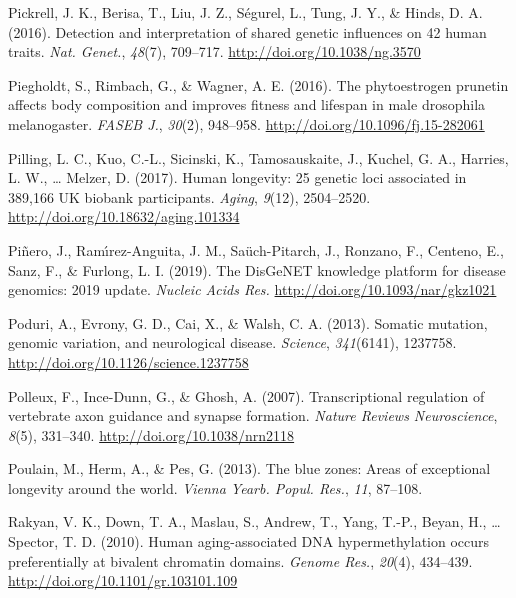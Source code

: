 \documentclass[12pt,twoside]{unicam}
\begin{document}
\begin{cslreferences}
\leavevmode\hypertarget{ref-Pickrell2016}{}%
Pickrell, J. K., Berisa, T., Liu, J. Z., Ségurel, L., Tung, J. Y., \& Hinds, D. A. (2016). Detection and interpretation of shared genetic influences on 42 human traits. \emph{Nat. Genet.}, \emph{48}(7), 709--717. \url{http://doi.org/10.1038/ng.3570}

\leavevmode\hypertarget{ref-Piegholdt2016}{}%
Piegholdt, S., Rimbach, G., \& Wagner, A. E. (2016). The phytoestrogen prunetin affects body composition and improves fitness and lifespan in male drosophila melanogaster. \emph{FASEB J.}, \emph{30}(2), 948--958. \url{http://doi.org/10.1096/fj.15-282061}

\leavevmode\hypertarget{ref-Pilling2017}{}%
Pilling, L. C., Kuo, C.-L., Sicinski, K., Tamosauskaite, J., Kuchel, G. A., Harries, L. W., \ldots{} Melzer, D. (2017). Human longevity: 25 genetic loci associated in 389,166 UK biobank participants. \emph{Aging}, \emph{9}(12), 2504--2520. \url{http://doi.org/10.18632/aging.101334}

\leavevmode\hypertarget{ref-Pinero2019}{}%
Piñero, J., Ramı́rez-Anguita, J. M., Saüch-Pitarch, J., Ronzano, F., Centeno, E., Sanz, F., \& Furlong, L. I. (2019). The DisGeNET knowledge platform for disease genomics: 2019 update. \emph{Nucleic Acids Res.} \url{http://doi.org/10.1093/nar/gkz1021}

\leavevmode\hypertarget{ref-Poduri2013}{}%
Poduri, A., Evrony, G. D., Cai, X., \& Walsh, C. A. (2013). Somatic mutation, genomic variation, and neurological disease. \emph{Science}, \emph{341}(6141), 1237758. \url{http://doi.org/10.1126/science.1237758}

\leavevmode\hypertarget{ref-Polleux2007}{}%
Polleux, F., Ince-Dunn, G., \& Ghosh, A. (2007). Transcriptional regulation of vertebrate axon guidance and synapse formation. \emph{Nature Reviews Neuroscience}, \emph{8}(5), 331--340. \url{http://doi.org/10.1038/nrn2118}

\leavevmode\hypertarget{ref-Poulain2013}{}%
Poulain, M., Herm, A., \& Pes, G. (2013). The blue zones: Areas of exceptional longevity around the world. \emph{Vienna Yearb. Popul. Res.}, \emph{11}, 87--108.

\leavevmode\hypertarget{ref-Rakyan2010}{}%
Rakyan, V. K., Down, T. A., Maslau, S., Andrew, T., Yang, T.-P., Beyan, H., \ldots{} Spector, T. D. (2010). Human aging-associated DNA hypermethylation occurs preferentially at bivalent chromatin domains. \emph{Genome Res.}, \emph{20}(4), 434--439. \url{http://doi.org/10.1101/gr.103101.109}


\end{cslreferences}
\end{document}
